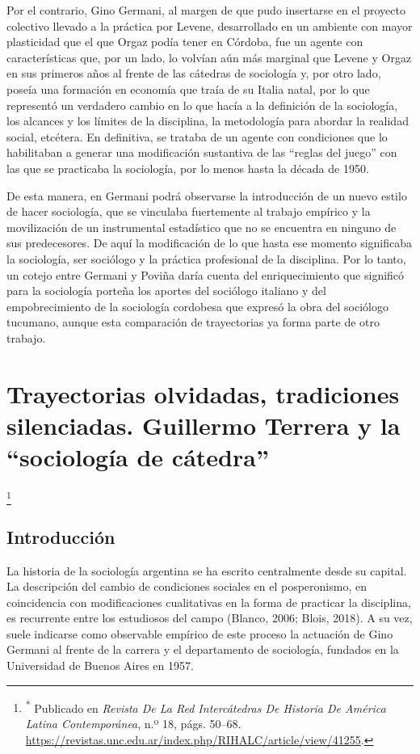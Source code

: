 Por el contrario, Gino Germani, al margen de que pudo insertarse en el proyecto colectivo llevado a la práctica por Levene, desarrollado en un ambiente con mayor plasticidad que el que Orgaz podía tener en Córdoba, fue un agente con características que, por un lado, lo volvían aún más marginal que Levene y Orgaz en sus primeros años al frente de las cátedras de sociología y, por otro lado, poseía una formación en economía que traía de su Italia natal, por lo que representó un verdadero cambio en lo que hacía a la definición de la sociología, los alcances y los límites de la disciplina, la metodología para abordar la realidad social, etcétera. En definitiva, se trataba de un agente con condiciones que lo habilitaban a generar una modificación sustantiva de las \enquote{reglas del juego} con las que se practicaba la sociología, por lo menos hasta la década de 1950.

De esta manera, en Germani podrá observarse la introducción de un nuevo estilo de hacer sociología, que se vinculaba fuertemente al trabajo empírico y la movilización de un instrumental estadístico que no se encuentra en ninguno de sus predecesores. De aquí la modificación de lo que hasta ese momento significaba la sociología, ser sociólogo y la práctica profesional de la disciplina. Por lo tanto, un cotejo entre Germani y Poviña daría cuenta del enriquecimiento que significó para la sociología porteña los aportes del sociólogo italiano y del empobrecimiento de la sociología cordobesa que expresó la obra del sociólogo tucumano, aunque esta comparación de trayectorias ya forma parte de otro trabajo.

\chapter{Trayectorias olvidadas, tradiciones silenciadas. Guillermo Terrera y la \enquote{sociología de cátedra}}

\footnote{\textsuperscript{*} Publicado en \emph{Revista De La Red Intercátedras De Historia De América Latina Contemporánea}, n.º 18, págs. 50--68. \url{https://revistas.unc.edu.ar/index.php/RIHALC/article/view/41255}.}

\section{Introducción}

La historia de la sociología argentina se ha escrito centralmente desde su capital. La descripción del cambio de condiciones sociales en el posperonismo, en coincidencia con modificaciones cualitativas en la forma de practicar la disciplina, es recurrente entre los estudiosos del campo \parencite[entre otros]{1450-VERON1974,1508-SIDICARO1993}(Blanco, 2006; Blois, 2018). A su vez, suele indicarse como observable empírico de este proceso la actuación de Gino Germani al frente de la carrera y el departamento de sociología, fundados en la Universidad de Buenos Aires en 1957.

